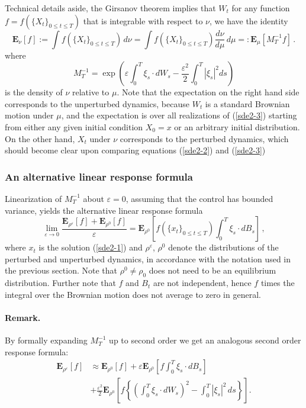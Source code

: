 \documentclass[]{tMPH2e}
\newcommand{\eps}{\varepsilon}
\newcommand{\bE}{{\mathbf E}}
\newcommand{\wrt}{with respect to }
\begin{document}
Technical details aside, the Girsanov theorem implies that $W_{t}$  for any function $f=f(\{X_{t}\}_{0\le t\le T})$ that is integrable \wrt $\nu$, we have the identity
\[
\bE_{\nu}[f] := \int f(\{X_{t}\}_{0\le t\le T})\, d\nu = \int f(\{X_{t}\}_{0\le t\le T}) \frac{d\nu}{d\mu}\,d\mu =: \bE_{\mu}[M^{-1}_{T}f]\,.
\]
where 
\[
M_{T}^{-1} = \exp\left(\eps\int_{0}^{T}\xi_{s}\cdot dW_{s} - \frac{\eps^{2}}{2}\int_{0}^{T}|\xi_{s}|^{2}ds\right)
\]
is the density of $\nu$ relative to $\mu$. Note that the expectation on the right hand side corresponds to the unperturbed dynamics, because $W_{t}$ is a standard Brownian motion under $\mu$, and the expectation is over all realizations of (\ref{sde2-3}) starting from either any given initial condition $X_{0}=x$ or an arbitrary initial distribution. On the other hand, $X_{t}$ under $\nu$ corresponds to the perturbed dynamics, which should become clear upon comparing equations (\ref{sde2-2}) and (\ref{sde2-3})

\subsubsection*{An alternative linear response formula}

Linearization of $M_{T}^{-1}$ about $\eps=0$, assuming that the control has bounded variance, yields the alternative linear response formula 
\begin{equation}\label{lr-alt}
\lim_{\eps\to 0}\frac{\bE_{\rho^{\eps}}[f] + \bE_{\rho^{0}}[f]}{\eps} = \bE_{\rho^{0}}\left[f(\{x_{t}\}_{0\le t\le T})\int_{0}^{T}\xi_{s}\cdot dB_{s} \right]\,,
\end{equation}
where $x_{t}$ is the solution (\ref{sde2-1}) and $\rho^{\eps}$, $\rho^{0}$ denote the distributions of the perturbed and unperturbed dynamics, in accordance with the notation used in the previous section. Note that $\rho^{0}\neq\rho_{0}$ does not need to be an equilibrium distribution. Further note that $f$ and $B_{t}$ are not independent, hence $f$ times the integral over the Brownian motion does not average to zero in general. 


\paragraph*{Remark.} 
 By formally expanding $M^{-1}_T$ up to second order we get an analogous second order response formula: 
\begin{equation}\label{2nd}
\begin{aligned}
\bE_{\rho^{\eps}}[f] & \approx \bE_{\rho^{0}}[f]  + \eps \bE_{\rho^{0}}\left[f\int_{0}^{T}\xi_{s}\cdot dB_{s} \right]\\  
& + \frac{\eps^{2}}{2} \bE_{\rho^{0}}\left[f\left\{\left(\int_{0}^{T}\xi_{s}\cdot dW_{s}\right)^2 -\int_0^T |\xi_s|^2\,ds\right\} \right].
\end{aligned}
\end{equation}
 
\end{document}
